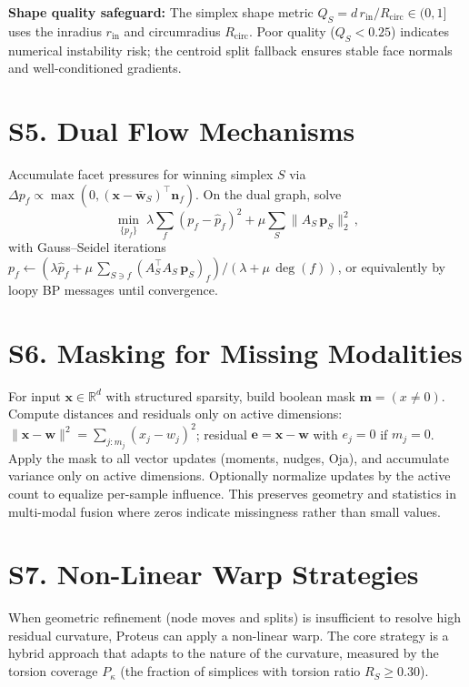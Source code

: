 \documentclass[11pt]{article}
\begin{document}
\textbf{Shape quality safeguard:} The simplex shape metric $Q_S = d\,r_{\mathrm{in}}/R_{\mathrm{circ}} \in (0,1]$ uses the inradius $r_{\mathrm{in}}$ and circumradius $R_{\mathrm{circ}}$. Poor quality ($Q_S < 0.25$) indicates numerical instability risk; the centroid split fallback ensures stable face normals and well-conditioned gradients.

\section*{S5. Dual Flow Mechanisms}
Accumulate facet pressures for winning simplex $S$ via $\Delta p_f \propto \max(0,(\mathbf x{-}\bar{\mathbf w}_S)^{\top}\mathbf n_f)$. On the dual graph, solve
\[\min_{\{p_f\}}\; \lambda\sum_f (p_f{-}\hat p_f)^2 + \mu\sum_S \lVert A_S\,\mathbf p_S\rVert_2^2\,,\]
with Gauss--Seidel iterations $p_f\leftarrow (\lambda\hat p_f + \mu\,\sum_{S\ni f}(A_S^{\top}A_S\,\mathbf p_S)_f)/(\lambda + \mu\,\deg(f))$, or equivalently by loopy BP messages until convergence.

\section*{S6. Masking for Missing Modalities}
For input $\mathbf x\in\mathbb R^d$ with structured sparsity, build boolean mask $\mathbf m=(x\neq 0)$. Compute distances and residuals only on active dimensions: $\lVert \mathbf x{-}\mathbf w\rVert^2=\sum_{j:m_j} (x_j{-}w_j)^2$; residual $\mathbf e=\mathbf x{-}\mathbf w$ with $e_j{=}0$ if $m_j{=}0$. Apply the mask to all vector updates (moments, nudges, Oja), and accumulate variance only on active dimensions. Optionally normalize updates by the active count to equalize per-sample influence. This preserves geometry and statistics in multi-modal fusion where zeros indicate missingness rather than small values.

\section*{S7. Non-Linear Warp Strategies}
When geometric refinement (node moves and splits) is insufficient to resolve high residual curvature, Proteus can apply a non-linear warp. The core strategy is a hybrid approach that adapts to the nature of the curvature, measured by the torsion coverage $P_\kappa$ (the fraction of simplices with torsion ratio $R_S \ge 0.30$).
\end{document}
